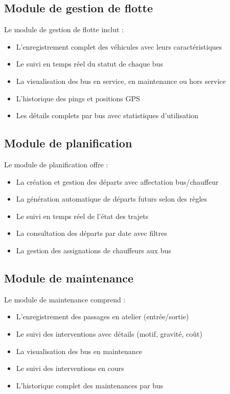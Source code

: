 \documentclass[a4paper, 12pt]{book}
\begin{document}
\subsection{Module de gestion de flotte}

Le module de gestion de flotte inclut :
\begin{itemize}
    \item L'enregistrement complet des véhicules avec leurs caractéristiques
    \item Le suivi en temps réel du statut de chaque bus
    \item La visualisation des bus en service, en maintenance ou hors service
    \item L'historique des pings et positions GPS
    \item Les détails complets par bus avec statistiques d'utilisation
\end{itemize}

\subsection{Module de planification}

Le module de planification offre :
\begin{itemize}
    \item La création et gestion des départs avec affectation bus/chauffeur
    \item La génération automatique de départs futurs selon des règles
    \item Le suivi en temps réel de l'état des trajets
    \item La consultation des départs par date avec filtres
    \item La gestion des assignations de chauffeurs aux bus
\end{itemize}

\subsection{Module de maintenance}

Le module de maintenance comprend :
\begin{itemize}
    \item L'enregistrement des passages en atelier (entrée/sortie)
    \item Le suivi des interventions avec détails (motif, gravité, coût)
    \item La visualisation des bus en maintenance
    \item Le suivi des interventions en cours
    \item L'historique complet des maintenances par bus
\end{itemize}
\end{document}
